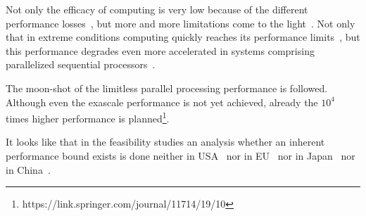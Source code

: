 {
Not only the efficacy of computing is very low because of the different performance 
losses~\cite{InefficiencyHameed2010}, but more and more limitations come to the light~\cite{NeuromorphicComputing:2015}.
Not only that in extreme conditions computing quickly reaches  its performance limits~\cite{NeuromorphicComputing:2015,LimitsOfLimits2014},
but this performance degrades even more accelerated in systems comprising parallelized sequential processors~\cite{VeghPerformanceWall:2019}.
}

{
The moon-shot of the limitless parallel processing performance is followed. Although even the exascale performance
is not yet achieved, already the $10^4$ times higher performance is planned\footnote{https://link.springer.com/journal/11714/19/10}.

It looks like that in the feasibility studies  an analysis
whether an inherent performance bound exists is done neither in USA~\cite{NSA_DOE_HPC_Report_2016} nor in  EU~\cite{EUActionPlan:2016}
nor in Japan~\cite{JapanExascale:2018} nor in China~\cite{ChinaExascale:2018}.
}